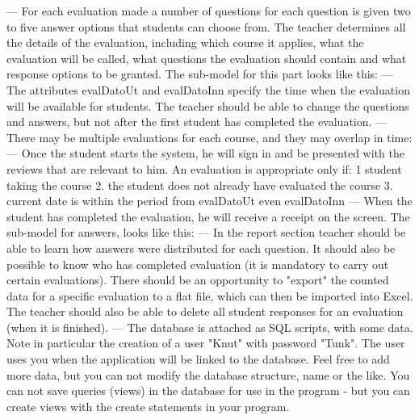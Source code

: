 ---
For each evaluation made a number of questions for each question is given two to five answer options that students can choose from. 
The teacher determines all the details of the evaluation, including which course it applies, what the evaluation will be called, 
what questions the evaluation should contain and what response options to be granted. 
The sub-model for this part looks like this:
---
The attributes evalDatoUt and evalDatoInn specify the time when the evaluation will be available for students. 
The teacher should be able to change the questions and answers, but not after the first student has completed the evaluation.
---
There may be multiple evaluations for each course, and they may overlap in time:
---
Once the student starts the system, he will sign in and be presented with the reviews that are relevant to him. 
An evaluation is appropriate only if:
1 student taking the course 
2. the student does not already have evaluated the course 
3. current date is within the period from evalDatoUt even evalDatoInn
---
When the student has completed the evaluation, he will receive a receipt on the screen. The sub-model for answers, looks like this:
---
In the report section teacher should be able to learn how answers were distributed for each question. 
It should also be possible to know who has completed evaluation (it is mandatory to carry out certain evaluations). 
There should be an opportunity to "export" the counted data for a specific evaluation to a flat file, which can then be imported into Excel. 
The teacher should also be able to delete all student responses for an evaluation (when it is finished).
---
The database is attached as SQL scripts, with some data. 
Note in particular the creation of a user "Knut" with password "Tunk". 
The user uses you when the application will be linked to the database. 
Feel free to add more data, but you can not modify the database structure, name or the like. 
You can not save queries (views) in the database for use in the program - but you can create views with the create statements in your program.

